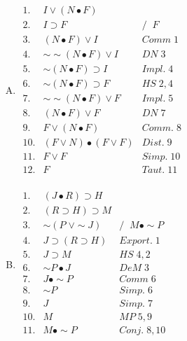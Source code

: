 \documentclass[10pt]{article}
\begin{document}
\begin{multicols}{2}

\begin{enumerate}[A.]
 \item $\begin{array}{lll}
         1. & I \vee (N \bullet F) & \\
         2. & I \supset F & /\;\; F \\
         3. & (N \bullet F) \vee I & Comm \;1 \\
         4. & \sim\!\sim\!(N \bullet F) \vee I & DN \;3 \\
         5. & \sim\!(N \bullet F) \supset I & Impl. \;4 \\
         6. & \sim\!(N \bullet F) \supset F & HS \;2,4 \\
         7. & \sim\!\sim\!(N \bullet F) \vee F & Impl. \;5 \\
         8. & (N \bullet F) \vee F & DN \;7 \\
         9. & F \vee (N \bullet F) & Comm. \;8 \\
         10. & (F \vee N) \bullet (F \vee F) & Dist. \;9 \\
         11. & F \vee F & Simp. \;10 \\
         12. & F & Taut. \;11 \\
        \end{array}$
        
 \columnbreak
        
 \item $\begin{array}{lll}
         1. & (J \bullet R) \supset H & \\
         2. & (R \supset H) \supset M & \\
         3. & \sim\!(P\; \vee \sim\! J) & /\;\; M \bullet \sim\! P \\
         4. & J \supset (R \supset H) & Export. \;1 \\
         5. & J \supset M & HS \;4,2 \\
         6. & \sim\! P \bullet J & DeM \;3 \\
         7. & J \bullet \sim\! P & Comm \;6 \\
         8. & \sim\! P & Simp. \;6 \\
         9. & J & Simp. \;7 \\
         10. & M & MP \;5,9 \\
         11. & M \bullet \sim\! P & Conj. \;8,10 \\
        \end{array}$
\end{enumerate}

\end{multicols}
\end{document}
